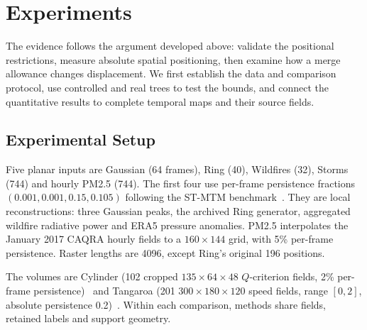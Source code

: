 
\begin{figure}[!tb]
\end{figure}


\section{Experiments}\label{sec:experiments}
The evidence follows the argument developed above: validate the positional restrictions, measure absolute spatial positioning, then examine how a merge allowance changes displacement. We first establish the data and comparison protocol, use controlled and real trees to test the bounds, and connect the quantitative results to complete temporal maps and their source fields.

\subsection{Experimental Setup}
Five planar inputs are Gaussian (64 frames), Ring (40), Wildfires (32), Storms (744) and hourly PM2.5 (744). The first four use per-frame persistence fractions $(0.001,0.001,0.15,0.105)$ following the ST-MTM benchmark~\cite{STMTM:2026}. They are local reconstructions: three Gaussian peaks, the archived Ring generator, aggregated wildfire radiative power and ERA5 pressure anomalies. PM2.5 interpolates the January 2017 CAQRA hourly fields to a $160\times144$ grid, with 5\% per-frame persistence. Raster lengths are 4096, except Ring's original 196 positions.

The volumes are Cylinder (102 cropped $135\times64\times48$ $Q$-criterion fields, 2\% per-frame persistence)~\cite{Camarri:2005:Cylinder,Weinkauf:SquareCylinder} and Tangaroa (201 $300\times180\times120$ speed fields, range $[0,2]$, absolute persistence 0.2)~\cite{Popinet:2004:Tangaroa}. Within each comparison, methods share fields, retained labels and support geometry.

